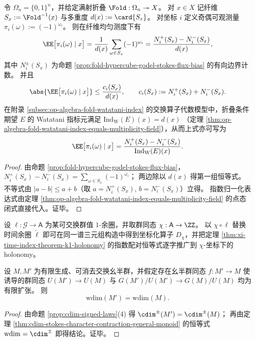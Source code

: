 \begin{proposition}\label{prop:discussion-fiber-stokes-watatani-normalization}
令 \(\Omega_n=\{0,1\}^n\)，并给定满射折叠 \(\Fold:\Omega_n\twoheadrightarrow X\)。
对 \(x\in X\) 记纤维 \(S_x:=\Fold^{-1}(x)\) 与多重度 \(d(x):=\card{S_x}\)。
对坐标 \(i\) 定义奇偶可观测量 \(\pi_i(\omega):=(-1)^{\omega_i}\)。
则在纤维均匀测度下有
\[
\EE\bigl[\pi_i(\omega)\mid x\bigr]
=\frac1{d(x)}\sum_{\omega\in S_x}(-1)^{\omega_i}
=\frac{N_i^+(S_x)-N_i^-(S_x)}{d(x)},
\]
其中 \(N_i^\pm(S_x)\) 为命题 \ref{prop:fold-hypercube-godel-stokes-flux-bias} 的有向边界计数。
并且
\[
\abs{\EE\bigl[\pi_i(\omega)\mid x\bigr]}
\le \frac{c_i(S_x)}{d(x)},
\qquad c_i(S_x):=N_i^+(S_x)+N_i^-(S_x).
\]
在附录 \ref{subsec:op-algebra-fold-watatani-index} 的交换算子代数模型中，折叠条件期望 \(E\) 的 Watatani 指标元满足
\(
\mathrm{Ind}_{\mathrm W}(E)(x)=d(x)
\)
（定理 \ref{thm:op-algebra-fold-watatani-index-equals-multiplicity-field}），从而上式亦可写为
\[
\EE\bigl[\pi_i(\omega)\mid x\bigr]
=\frac{N_i^+(S_x)-N_i^-(S_x)}{\mathrm{Ind}_{\mathrm W}(E)(x)}.
\]
\end{proposition}
\begin{proof}
由命题 \ref{prop:fold-hypercube-godel-stokes-flux-bias}，
\(
N_i^+(S_x)-N_i^-(S_x)=\sum_{\omega\in S_x}(-1)^{\omega_i}
\)；
两边除以 \(d(x)\) 得第一组恒等式。
不等式由 \(|a-b|\le a+b\)（取 \(a=N_i^+(S_x)\), \(b=N_i^-(S_x)\)）立得。
指数归一化表达式由定理 \ref{thm:op-algebra-fold-watatani-index-equals-multiplicity-field} 的点态闭式直接代入。证毕。
\end{proof}

\begin{corollary}[中心扩张读出的坐标化指数配对]\label{cor:discussion-character-index-holonomy}
设 \(\ell:\mathcal G\to \mathsf A\) 为某可交换群值 \(1\)-余圈，并取群同态 \(\chi:\mathsf A\to\ZZ\)。
以 \(\chi\circ \ell\) 替换时间余圈 \(\widetilde\ell\) 即可在同一谱三元组构造中得到坐标化算子 \(D_\chi\)，并把定理 \ref{thm:xi-time-index-theorem-k1-holonomy} 的指数配对恒等式逐字推广到 \(\chi\)-坐标下的 holonomy。
\end{corollary}

\begin{corollary}\label{cor:discussion-wdim-finite-index-stability}
设 \(M,M'\) 为有限生成、可消去交换幺半群，并假定存在幺半群同态 \(f:M'\to M\) 使诱导的群同态
\(
U(M')\to U(M)
\)
与
\(
G(M')/U(M')\to G(M)/U(M)
\)
均为有限扩张。
则
\[
\mathrm{wdim}(M')=\mathrm{wdim}(M).
\]
\end{corollary}
\begin{proof}
由命题 \ref{prop:cdim-signed-laws}(4) 得 \(\cdim^{\pm}(M')=\cdim^{\pm}(M)\)；
再由定理 \ref{thm:cdim-stokes-character-contraction-general-monoid} 的恒等式 \(\mathrm{wdim}=\cdim^{\pm}\) 即得结论。证毕。
\end{proof}

\endinput
